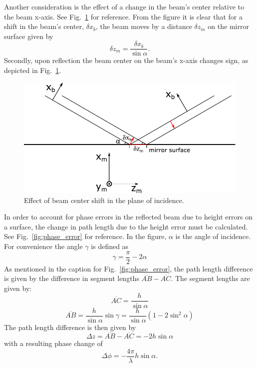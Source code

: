 \documentclass[11pt,fleqn]{article} %
\begin{document}
Another consideration is the effect of a change in the beam's center relative to the beam x-axis. See Fig.~\ref{fig:beam_shift} for reference. From the figure it is clear that for a shift in the beam's center, $\delta x_b$, the beam moves by a distance $\delta z_m$ on the mirror surface given by
\begin{equation}
\label{eq:beam_shift}
\delta z_m = \frac{\delta x_b}{\sin\alpha}.
\end{equation}
Secondly, upon reflection the beam center on the beam's x-axis changes sign, as depicted in Fig.~\ref{fig:beam_shift}.

\begin{figure}[htb]
\begin{center}
\includegraphics[width=1.0\textwidth]{Figures/beam_shift.pdf}
\caption{Effect of beam center shift in the plane of incidence.}
\label{fig:beam_shift}
\end{center}
\end{figure}

In order to account for phase errors in the reflected beam due to height errors on a surface, the change in path length due to the height error must be calculated. See Fig.~\ref{fig:phase_error} for reference. In the figure, $\alpha$ is the angle of incidence. For convenience the angle $\gamma$ is defined as
\begin{equation}
\gamma = \frac{\pi}{2} - 2 \alpha
\end{equation}
As mentioned in the caption for Fig.~\ref{fig:phase_error}, the path length difference is given by the difference in segment lengths $\overline{AB} - \overline{AC}$. The segment lengths are given by:
\begin{equation}
\label{eq:AC}
\overline{AC} = \frac{h}{\sin\alpha}
\end{equation}
\begin{equation}
\overline{AB} = \frac{h}{\sin\alpha} \sin\gamma = \frac{h}{\sin\alpha} \left( 1 - 2 \sin^2\alpha \right)
\end{equation}
The path length difference is then given by
\begin{equation}
\Delta z = \overline{AB} - \overline{AC} = - 2 h \sin\alpha
\end{equation}
with a resulting phase change of
\begin{equation}
\label{eq:mirror_phase}
\Delta \phi = - \frac{4 \pi}{\lambda} h \sin\alpha.
\end{equation}
\end{document}
